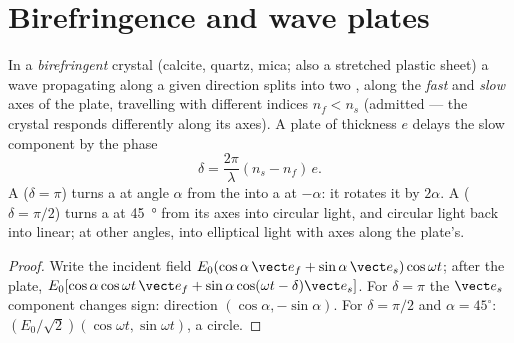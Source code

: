 \section{Birefringence and wave plates}

\begin{proposition}\label{prop:b2:plane-waves-polarization:plates}
In a \emph{birefringent} crystal (calcite, quartz, mica; also a
stretched plastic sheet) a wave propagating along a given direction
splits into two , along the \emph{fast} and
\emph{slow} axes of the plate, travelling with different indices $n_f <
n_s$ (admitted --- the crystal responds differently along its axes). A
plate of thickness $e$ delays the slow component by the phase
\[
\delta = \frac{2\pi}\lambda(n_s - n_f)\,e .
\]
A \emph{} ($\delta = \pi$) turns a  at
angle $\alpha$ from the  into a  at $-\alpha$: it
rotates it by $2\alpha$. A \emph{} ($\delta = \pi/2$) turns a
 at \qty{45}{\degree} from its axes into circular light,
and circular light back into linear; at other angles, into elliptical
light with axes along the plate's.
\end{proposition}

\begin{proof}
Write the incident field $E_0(\cos\alpha\,\vect e_f + \sin\alpha\,\vect e_s)\cos\omega t$;
after the plate, $E_0[\cos\alpha\cos\omega t\,\vect e_f + \sin\alpha\cos(\omega t - \delta)
\vect e_s]$. For $\delta = \pi$ the $\vect e_s$ component changes sign: direction
$(\cos\alpha, -\sin\alpha)$. For $\delta = \pi/2$ and $\alpha = 45^\circ$: $(E_0/\sqrt2)(\cos
\omega t, \sin\omega t)$, a circle.
\end{proof}

